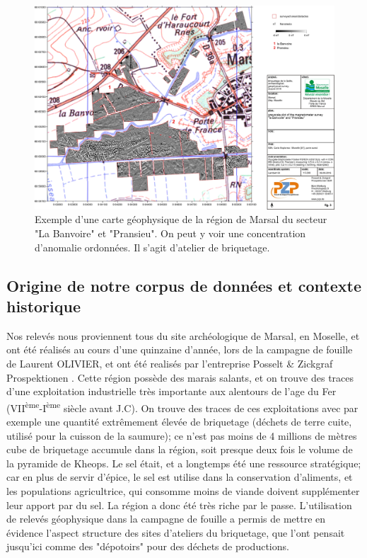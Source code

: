 \documentclass[a4paper, 12pt, titlepage, oneside, french]{article}
\begin{document}
\begin{figure}[H]
	\centering
		\includegraphics[width =\textwidth]{ExempleMap.jpg}
		\caption{Exemple d'une carte géophysique de la région de Marsal du secteur "La Banvoire" et "Pransieu". On peut y voir une concentration d'anomalie ordonnées. Il s'agit d'atelier de briquetage.}
		\label{fig:ExempleMap}
\end{figure}

	\subsection{Origine de notre corpus de données et contexte historique}

	Nos relevés nous proviennent tous du site archéologique de Marsal, en Moselle, et ont été réalisés au cours d'une quinzaine d'année, lors de la campagne de fouille de Laurent OLIVIER, et ont été realisés par l'entreprise Posselt \& Zickgraf Prospektionen\cite{ArcheoGeo} %
	. Cette région possède des marais salants, et on trouve des traces d'une exploitation industrielle très importante aux alentours de l'age du Fer (VII\textsuperscript{ème}-I\textsuperscript{ème} siècle avant J.C). On trouve des traces de ces exploitations avec par exemple une quantité extrêmement élevée de briquetage (déchets de terre cuite, utilisé pour la cuisson de la saumure); ce n'est pas moins de 4 millions de mètres cube de briquetage accumule dans la région, soit presque deux fois le volume de la pyramide de Kheops. Le sel était, et a longtemps été une ressource stratégique; car en plus de servir d'épice, le sel est utilise dans la conservation d'aliments, et les populations agricultrice, qui consomme moins de viande doivent supplémenter leur apport par du sel. La région a donc été très riche par le passe. 
	L'utilisation de relevés géophysique dans la campagne de fouille a permis de mettre en évidence l'aspect structure des sites d'ateliers du briquetage, que l'ont pensait jusqu'ici comme des "dépotoirs" pour des déchets de productions. \cite{ArcheoLabo} 
\end{document}
